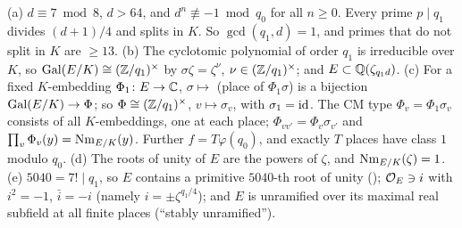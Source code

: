 \begin{proposition}\label{data:prop:field}
(a) $d \equiv 7 \bmod 8$, $d > 64$, and $d^n \not\equiv -1 \bmod q_0$ for all $n \ge 0$. Every
prime $p \mid q_1$ divides $(d+1)/4$ and splits in $K$. So $\gcd(q_1,d) = 1$, and primes that do
not split in $K$ are $\ge 13$. (b) The cyclotomic polynomial of order $q_1$ is irreducible over
$K$, so $\operatorname{Gal}(E/K) \cong (\mathbb{Z}/q_1)^\times$ by $\sigma\zeta = \zeta^\nu$, $\nu \in (\mathbb{Z}/q_1)^\times$;
and $E \subset \mathbb{Q}(\zeta_{q_1d})$. (c) For a fixed $K$-embedding $\Phi_1 \colon E \to \mathbb{C}$,
$\sigma \mapsto$ (place of $\Phi_1\sigma$) is a bijection $\operatorname{Gal}(E/K) \to \Phi$; so
$\Phi \cong (\mathbb{Z}/q_1)^\times$, $v \mapsto \sigma_v$, with $\sigma_1 = \operatorname{id}$. The CM type
$\Phi_v = \Phi_1\sigma_v$ consists of all $K$-embeddings, one at each place;
$\Phi_{vv'} = \Phi_v\sigma_{v'}$ and $\prod_v \Phi_v(y) = \operatorname{Nm}_{E/K}(y)$. Further
$f = T\varphi(q_0)$, and exactly $T$ places have class $1$ modulo $q_0$. (d) The roots of unity
of $E$ are the powers of $\zeta$, and $\operatorname{Nm}_{E/K}(\zeta) = 1$. (e) $5040 = 7! \mid q_1$, so $E$
contains a primitive $5040$-th root of unity ();
$\mathcal{O}_E \ni i$ with $i^2 = -1$, $\bar i = -i$ (namely $i = \pm\zeta^{q_1/4}$); and $E$ is
unramified over its maximal real subfield at all finite places (``stably unramified'').
\end{proposition}

